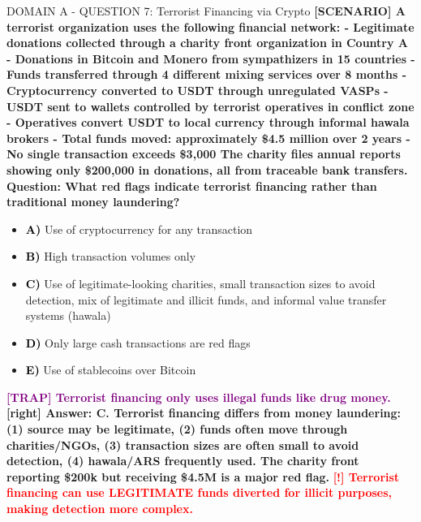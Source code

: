 \documentclass[11pt,a4paper]{beamer}
\newcommand{\redflag}[1]{\textcolor{red}{\textbf{[!] #1}}}
\newcommand{\trap}[1]{\textcolor{purple}{\textbf{[TRAP] #1}}}
\newcommand{\correct}[1]{\textcolor{green!50!black}{\textbf{[right] #1}}}
\newcommand{\scenario}[1]{\textcolor{blue!70!black}{\textbf{[SCENARIO] #1}}}
\newcommand{\option}[1]{\textcolor{black}{\textbf{#1}}}
\begin{document}
\begin{frame}{DOMAIN A - QUESTION 7: Terrorist Financing via Crypto}
\scenario{A terrorist organization uses the following financial network:
- Legitimate donations collected through a charity front organization in Country A
- Donations in Bitcoin and Monero from sympathizers in 15 countries
- Funds transferred through 4 different mixing services over 8 months
- Cryptocurrency converted to USDT through unregulated VASPs
- USDT sent to wallets controlled by terrorist operatives in conflict zone
- Operatives convert USDT to local currency through informal hawala brokers
- Total funds moved: approximately \$4.5 million over 2 years
- No single transaction exceeds \$3,000
The charity files annual reports showing only \$200,000 in donations, all from traceable bank transfers.}
\vspace{0.2cm}
\textbf{Question: What red flags indicate terrorist financing rather than traditional money laundering?}
\vspace{0.1cm}
\begin{itemize}
    \item \option{A)} Use of cryptocurrency for any transaction
    \item \option{B)} High transaction volumes only
    \item \option{C)} Use of legitimate-looking charities, small transaction sizes to avoid detection, mix of legitimate and illicit funds, and informal value transfer systems (hawala)
    \item \option{D)} Only large cash transactions are red flags
    \item \option{E)} Use of stablecoins over Bitcoin
\end{itemize}
\vspace{0.2cm}
\trap{Terrorist financing only uses illegal funds like drug money.}
\correct{Answer: C. Terrorist financing differs from money laundering: (1) source may be legitimate, (2) funds often move through charities/NGOs, (3) transaction sizes are often small to avoid detection, (4) hawala/ARS frequently used. The charity front reporting \$200k but receiving \$4.5M is a major red flag.}
\redflag{Terrorist financing can use LEGITIMATE funds diverted for illicit purposes, making detection more complex.}
\end{frame}
\end{document}
